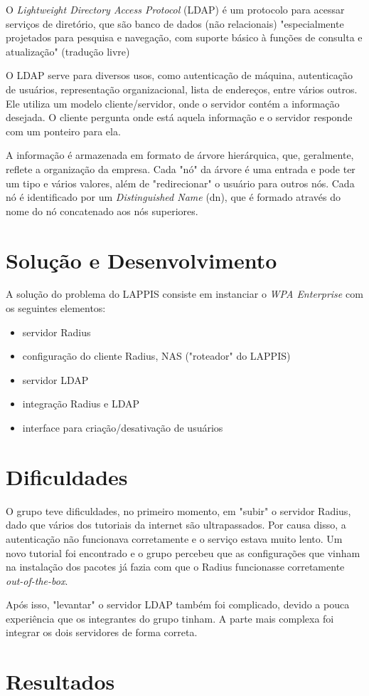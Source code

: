 O \textit{Lightweight Directory Access Protocol} (LDAP) é um protocolo para acessar
serviços de diretório, que são banco de dados (não relacionais) "especialmente
projetados para pesquisa e navegação, com suporte básico à funções de consulta e
atualização" (tradução livre) \cite{openldap}

O LDAP serve para diversos usos, como autenticação de máquina, autenticação de usuários,
representação organizacional, lista de endereços, entre vários outros. Ele utiliza
um modelo cliente/servidor, onde o servidor contém a informação desejada. O cliente
pergunta onde está aquela informação e o servidor responde com um ponteiro para ela.\cite{openldap}

A informação é armazenada em formato de árvore hierárquica, que, geralmente, reflete
a organização da empresa. Cada "nó" da árvore é uma entrada e pode ter um tipo e vários
valores, além de "redirecionar" o usuário para outros nós. Cada nó é identificado
por um \textit{Distinguished Name} (dn), que é formado através do nome do nó concatenado
aos nós superiores.\cite{openldap}


\section{Solução e Desenvolvimento}

A solução do problema do LAPPIS consiste em instanciar o \textit{WPA Enterprise}
com os seguintes elementos:

\begin{itemize}
    \item servidor Radius
    \item configuração do cliente Radius, NAS ("roteador" do LAPPIS)
    \item servidor LDAP
    \item integração Radius e LDAP
    \item interface para criação/desativação de usuários
\end{itemize}

\section{Dificuldades}

O grupo teve dificuldades, no primeiro momento, em "subir" o servidor Radius,
dado que vários dos tutoriais da internet são ultrapassados. Por causa disso,
a autenticação não funcionava corretamente e o serviço estava muito lento.
Um novo tutorial foi encontrado e o grupo percebeu que as configurações que
vinham na instalação dos pacotes já fazia com que o Radius funcionasse corretamente
\textit{out-of-the-box}.

Após isso, "levantar" o servidor LDAP também foi complicado, devido a pouca
experiência que os integrantes do grupo tinham.
A parte mais complexa foi integrar os dois servidores de forma correta.

\section{Resultados}

